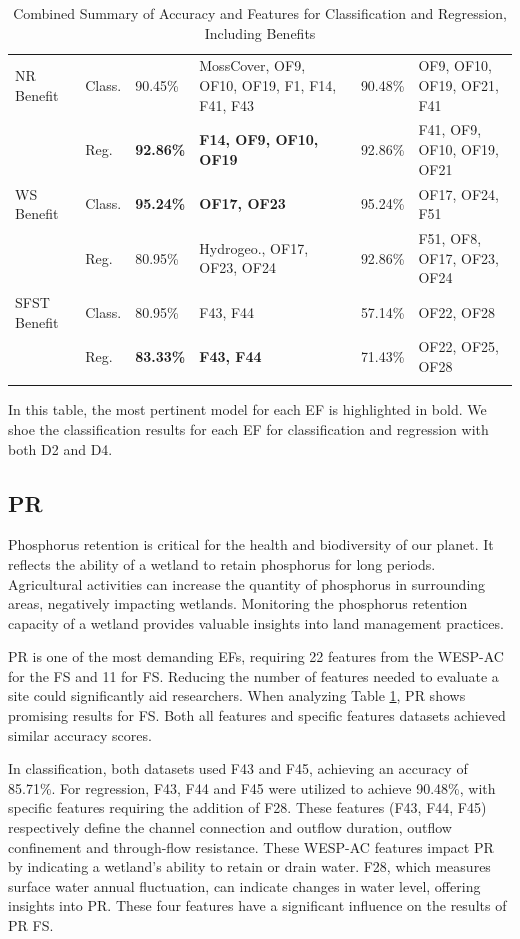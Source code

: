 \documentclass[12pt,letterpaper]{article}
\begin{document}
\begin{longtable}{|p{2cm}|p{1.5cm}|p{1.5cm}|p{3.5cm}|p{1.5cm}|p{3.5cm}|}
\hline
NR Benefit & Class. & 90.45\% & MossCover, OF9, OF10, OF19, F1, F14, F41, F43 & 90.48\% & OF9, OF10, OF19, OF21, F41 \\
\cline{2-6}
 & Reg. & \textbf{92.86\%} & \textbf{F14, OF9, OF10, OF19} & 92.86\% & F41, OF9, OF10, OF19, OF21 \\
\hline
WS Benefit & Class. & \textbf{95.24\%} & \textbf{OF17, OF23} & 95.24\% & OF17, OF24, F51 \\
\cline{2-6}
 & Reg. & 80.95\% & Hydrogeo., OF17, OF23, OF24 & 92.86\% & F51, OF8, OF17, OF23, OF24 \\
\hline
SFST Benefit & Class. & 80.95\% &  F43, F44 & 57.14\% & OF22, OF28 \\
\cline{2-6}
 & Reg. & \textbf{83.33\%} & \textbf{F43, F44 }& 71.43\% & OF22, OF25, OF28 \\
\hline
\caption{Combined Summary of Accuracy and Features for Classification and Regression, Including Benefits}
\label{tab:combined_summary}
\end{longtable}

In this table, the most pertinent model for each \ac{EF} is highlighted in bold.
We shoe the classification results for each \ac{EF} for classification and regression with both D2 and D4.

\subsection{PR}
Phosphorus retention is critical for the health and biodiversity of our planet.
It reflects the ability of a wetland to retain phosphorus for long periods.
Agricultural activities can increase the quantity of phosphorus in surrounding areas, negatively impacting wetlands.
Monitoring the phosphorus retention capacity of a wetland provides valuable insights into land management practices.

PR is one of the most demanding \ac{EF}s, requiring 22 features from the \ac{WESP-AC} for the \ac{FS} and 11 for \ac{FS}.
Reducing the number of features needed to evaluate a site could significantly aid researchers.
When analyzing Table \ref{tab:combined_summary}, \ac{PR} shows promising results for \ac{FS}.
Both all features and specific features datasets achieved similar accuracy scores.

In classification, both datasets used F43 and F45, achieving an accuracy of 85.71\%.
For regression, F43, F44 and F45 were utilized to achieve 90.48\%, with specific features requiring the addition of F28.
These features (F43, F44, F45) respectively define the channel connection and outflow duration, outflow confinement and through-flow resistance.
These WESP-AC features impact \ac{PR} by indicating a wetland's ability to retain or drain water.
F28, which measures surface water annual fluctuation, can indicate changes in water level, offering insights into \ac{PR}.
These four features have a significant influence on the results of \ac{PR} \ac{FS}.
\end{document}
